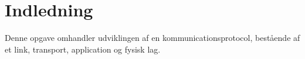 \chapter{Indledning}\label{ch:introduction}
Denne opgave omhandler udviklingen af en kommunicationsprotocol, bestående af et link, transport, application og fysisk lag.  